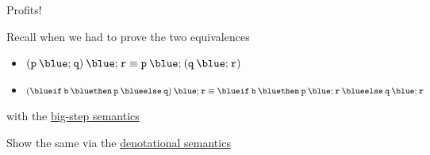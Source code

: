 \documentclass{beamer}
\begin{document}
\begin{frame}{Profits!}

        Recall when we had to prove the two equivalences
        \begin{itemize}
                \item $\mathtt{(p \> {\blue ;} \> q) \> {\blue ;} \> r} \equiv
                        \mathtt{p \> {\blue ;} \> (q \> {\blue ;} \> r)}$
                \item $\mathtt{({\blue if} \> b \> {\blue then} \> p \> {\blue else} \> q) 
                      \> {\blue ;} \> \prog{r}} \equiv 
                      \mathtt{{\blue if} \> b \> {\blue then} \> p \> {\blue ;} \> r \> 
                      {\blue else} \> q \> {\blue ;} \> r}$ 
        \end{itemize}
        with the \alert{\underline{big-step semantics}}

        \bigskip
        Show the same via the \alert{\underline{denotational semantics}}
\end{frame}
\end{document}
